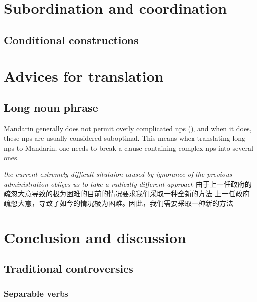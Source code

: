 \documentclass[UTF8, a4paper, oneside, scheme=plain, 12pt]{ctexrep}
\newcommand{\form}[1]{\emph{#1}}
\begin{document}
\chapter{Subordination and coordination}

\section{Conditional constructions}



\chapter{Advices for translation}

\section{Long noun phrase}\label{sec:translation.long-noun-phrases}

Mandarin generally does not permit overly complicated \acp{np} (),
and when it does, these \acp{np} are usually considered suboptimal.
This means when translating long \acp{np} to Mandarin,
one needs to break a clause containing complex \acp{np} into several ones.

\begin{exe}
    \ex\begin{xlist}
        \ex \form{the current extremely difficult situtaion caused by ignorance of the previous administration obliges us to take a radically different approach}
        \ex 由于上一任政府的疏忽大意导致的极为困难的目前的情况要求我们采取一种全新的方法
        \ex 上一任政府疏忽大意，导致了如今的情况极为困难。因此，我们需要采取一种新的方法
    \end{xlist}
\end{exe}

\chapter{Conclusion and discussion}

\section{Traditional controversies}

\subsection{Separable verbs}
\end{document}
